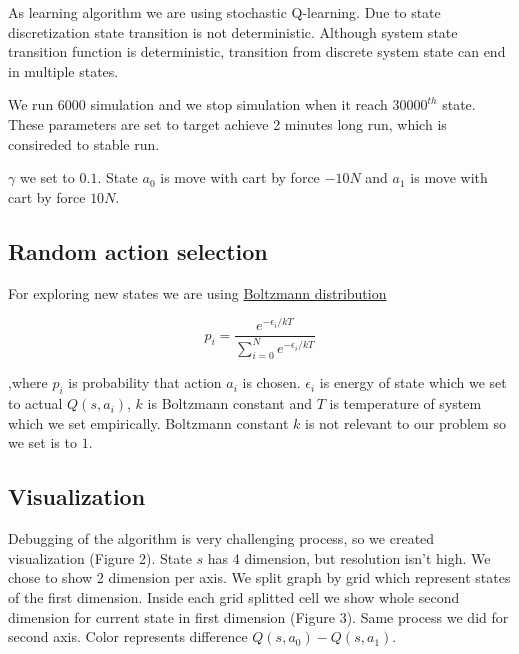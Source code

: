 \documentclass[12pt,a4paper]{article}
\begin{document}
As learning algorithm we are using stochastic Q-learning. Due to state discretization state transition is not deterministic. Although system state transition function is deterministic, transition from discrete system state can end in multiple states. 


We run 6000 simulation and we stop simulation when it reach $30000^{th}$ state. These parameters are set to target achieve 2 minutes long run, which is consireded to stable run.

$\gamma$ we set to $0.1$. State $a_0$ is move with cart by force $-10N$ and $a_1$ is move with cart by force $10N$.

\subsection{Random action selection}

For exploring new states we are using \href{distriburion https://en.wikipedia.org/wiki/Boltzmann\_distribution}{Boltzmann distribution}

$$
p_i = \frac{e^{-\epsilon_i/kT}}
                        {\sum\limits_{i=0}^N e^{-\epsilon_i/kT}}
$$

\noindent
,where $p_i$ is probability that action $a_i$ is chosen. $\epsilon_i$ is energy of state which we set to actual $Q(s, a_i)$, $k$ is Boltzmann constant and $T$ is temperature of system which we set empirically. Boltzmann constant $k$ is not relevant to our problem so we set is to $1$.

\subsection{Visualization}

Debugging of the algorithm is very challenging process, so we created visualization (Figure 2). State $s$ has 4 dimension, but resolution isn't high. We chose to show 2 dimension per axis. We split graph by grid which represent states of the first dimension. Inside each grid splitted cell we show whole second dimension for current state in first dimension (Figure 3). Same process we did for second axis. Color represents difference $Q(s, a_0) - Q(s, a_1)$.
\end{document}
